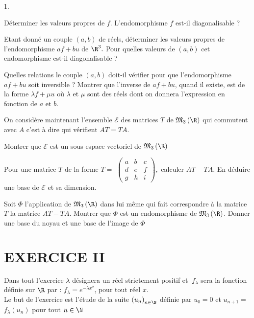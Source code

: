 \documentclass[11pt]{article}%
\begin{document}
\begin{noliste}{1.}
 \setlength{\itemsep}{4mm}
\item Déterminer les valeurs propres de $f$. L'endomorphisme $f$ est-il
diagonalisable ?

\item Etant donné un couple $\left( a,b\right) $ de réels, déterminer
les
valeurs propres de l'endomorphisme $af + bu$ de $\R^{3}.$ Pour quelles
valeurs de $\left( a,b\right) $ cet endomorphisme est-il diagonalisable
?

\item Quelles relations le couple $\left( a,b\right) $ doit-il vérifier
pour
que l'endomorphisme $af + bu$ soit inversible ? Montrer que l'inverse
de $af + bu$, quand il existe, est de la forme $\lambda f + \mu u$ où
$\lambda $ et $\mu $
sont des réels dont on donnera l'expression en fonction de $a$ et $b$.

On considère maintenant l'ensemble $\mathcal{E}$ des matrices $T$ de
$\mathfrak{M}_{3}\left( \R\right) $ qui commutent avec $A$ c'est à
dire qui vérifient $AT = TA$.

\item Montrer que $\mathcal{E}$ est un sous-espace vectoriel de
$\mathfrak{M}_{3}\left( \R\right) $

\item Pour une matrice $T$ de la forme $T = $ $\left( 
\begin{array}{ccc}
a & b & c \\
d & e & f \\
g & h & i
\end{array}
\right),$ calculer $AT-TA$. En déduire une base de $\mathcal{E}$ et sa
dimension.

\item Soit $\Phi $ l'application de $\mathfrak{M}_{3}\left( \R\right) $
dans lui même qui fait correspondre à la matrice $T$ la matrice
$AT-TA$. Montrer que $\Phi $ est un endomorphisme de
$\mathfrak{M}_{3}\left( 
\R\right) $. Donner une base du noyau et une base de l'image de $\Phi $
\end{noliste}

\section*{EXERCICE II}

Dans tout l'exercice $\lambda $ désignera un réel strictement positif
et $\
f_{\lambda }$ sera la fonction définie sur $\R$ par : $f_{\lambda
} = e^{-\lambda x^{2}}$, pour tout réel $x$.\\
Le but de l'exercice est l'étude de la suite $\left( u_{n}\right)_{n\in

\N}$ définie par $u_{0} = 0$ et $u_{n + 1} = $ $f_{\lambda }\left(
u_{n}\right) $ pour tout $n\in \N$
\end{document}

